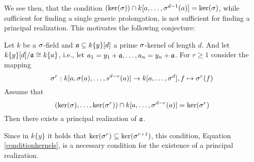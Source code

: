 We see then, that the condition $(\operatorname{ker}(\sigma)) \cap k[a,\ldots,\sigma^{d-1}(a)] = \operatorname{ker}(\sigma)$, while sufficient for finding a single generic prolongation,
is not sufficient for finding a principal realization. This motivates the following conjecture:

\begin{conj}
Let $k$ be a $\sigma$-field and $\mathfrak{a} \subseteq k\{y\}[d]$ a prime $\sigma$-kernel of length $d$.
And let $k\{y\}[d]/\mathfrak{a} \cong k\{a\}$, i.e., let $a_1 = y_1 + \mathfrak{a} ,\ldots,a_n = y_n + \mathfrak{a}$.
For $r \geq 1$ consider the mapping 
\[ \sigma^r : k[a,\sigma(a),\ldots,s^{d-r}(a)] \rightarrow k[a,\ldots,\sigma^{d}], f \mapsto \sigma^r(f) \]
Assume that
\begin{equation}\label{conditionkernels} (\operatorname{ker}(\sigma),\ldots,\operatorname{ker}(\sigma^r)) \cap k[a,\ldots,\sigma^{d-r}(a)] = \operatorname{ker}(\sigma^r) \end{equation}
Then there exists a principal realization of $\mathfrak{a}$.
\end{conj}

Since in $k\{y\}$ it holds that $\operatorname{ker}(\sigma^r) \subseteq \operatorname{ker}(\sigma^{r+1})$, this condition,
Equation \ref{conditionkernels}, is a necessary condition for the existence of a principal realization. 




